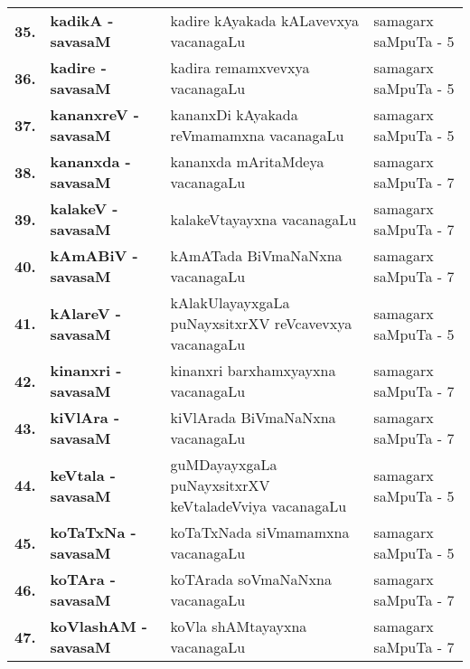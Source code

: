 {\renewcommand{\arraystretch}{1.35}
\begin{longtable}{>{\bf}r>{\bf}l>{\raggedright}p{8cm}l}
\endfirsthead
\endhead
\endfoot
\endlastfoot
35. &  kadikA - savasaM &  kadire kAyakada kALavevxya vacanagaLu & samagarx saMpuTa - 5\\
36. &  kadire - savasaM &  kadira remamxvevxya vacanagaLu & samagarx saMpuTa - 5\\
37. &  kananxreV - savasaM & kananxDi kAyakada reVmamamxna vacanagaLu & samagarx saMpuTa - 5 \\
38. &  kananxda - savasaM & kananxda mAritaMdeya vacanagaLu & samagarx saMpuTa - 7 \\
39. &  kalakeV - savasaM & kalakeVtayayxna vacanagaLu & samagarx saMpuTa - 7 \\
40. &  kAmABiV - savasaM & kAmATada BiVmaNaNxna vacanagaLu & samagarx saMpuTa - 7 \\
41. &  kAlareV - savasaM & kAlakUlayayxgaLa puNayxsitxrXV reVcavevxya vacanagaLu & samagarx saMpuTa - 5 \\
42. &  kinanxri - savasaM & kinanxri barxhamxyayxna vacanagaLu & samagarx saMpuTa - 7 \\
43. &  kiVlAra - savasaM & kiVlArada BiVmaNaNxna vacanagaLu & samagarx saMpuTa - 7 \\
44. &  keVtala - savasaM & guMDayayxgaLa puNayxsitxrXV keVtaladeVviya vacanagaLu & samagarx saMpuTa - 5 \\
45. &  koTaTxNa - savasaM & koTaTxNada siVmamamxna vacanagaLu & samagarx saMpuTa - 5 \\
46. &  koTAra - savasaM & koTArada soVmaNaNxna vacanagaLu & samagarx saMpuTa - 7 \\
47. &  koVlashAM - savasaM & koVla shAMtayayxna vacanagaLu & samagarx saMpuTa - 7
\end{longtable}}
\medskip


